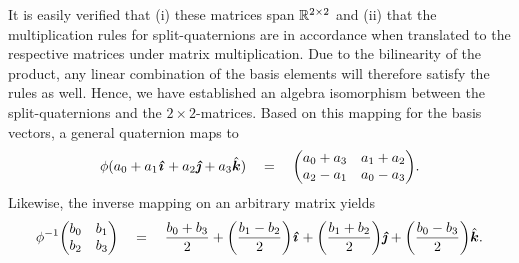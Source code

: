 It is easily verified that (i) these matrices span $\mathbb{R}^{2\times2}$ and (ii) that the multiplication rules for split-quaternions are in accordance when translated to the respective matrices under matrix multiplication. Due to the bilinearity of the product, any linear combination of the basis elements will therefore satisfy the rules as well. Hence, we have established an algebra isomorphism between the split-quaternions and the $2\times 2$-matrices. Based on this mapping for the basis vectors, a general quaternion maps to 
$$ \phi(\quat{a_0}{a_1}{a_2}{a_3}) \quad = \quad \mqty(a_0 + a_3 & a_1 + a_2 \\ a_2 - a_1 & a_0 - a_3). $$
Likewise, the inverse mapping on an arbitrary matrix yields
$$ \phi^{-1}\mqty(b_0 & b_1 \\ b_2 & b_3) \quad = \quad \quat{\frac{b_0 + b_3}{2}}{\qty(\frac{b_1 - b_2}{2})}{\qty(\frac{b_1 + b_2}{2})}{\qty(\frac{b_0 - b_3}{2})}.$$

